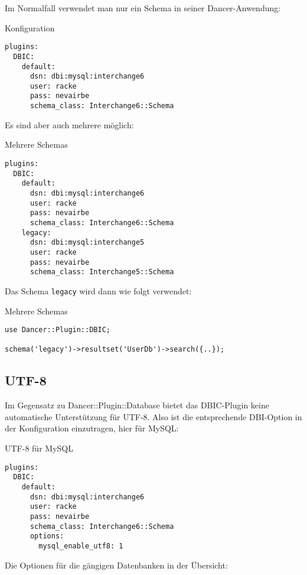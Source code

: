 Im Normalfall verwendet man nur ein Schema in seiner
Dancer-Anwendung:

\begin{frame}[fragile]{Konfiguration}
\begin{lstlisting}
plugins:
  DBIC:
    default:
      dsn: dbi:mysql:interchange6
      user: racke
      pass: nevairbe
      schema_class: Interchange6::Schema
\end{lstlisting}
\end{frame}

Es sind aber auch mehrere möglich:

\begin{frame}[fragile]{Mehrere Schemas}
\begin{lstlisting}
plugins:
  DBIC:
    default:
      dsn: dbi:mysql:interchange6
      user: racke
      pass: nevairbe
      schema_class: Interchange6::Schema
    legacy:
      dsn: dbi:mysql:interchange5
      user: racke
      pass: nevairbe
      schema_class: Interchange5::Schema
\end{lstlisting}
\end{frame}

Das Schema \verb|legacy| wird dann wie folgt verwendet:

\begin{frame}[fragile]{Mehrere Schemas}
\begin{lstlisting}
use Dancer::Plugin::DBIC;

schema('legacy')->resultset('UserDb')->search({..});
\end{lstlisting}
\end{frame}

\subsection{UTF-8}
Im Gegensatz zu Dancer::Plugin::Database bietet das DBIC-Plugin
keine automatische Unterstützung für UTF-8. Also ist die entsprechende
DBI-Option in der Konfiguration einzutragen, hier für MySQL:
\begin{frame}[fragile]{UTF-8 für MySQL}
\begin{lstlisting}
plugins:
  DBIC:
    default:
      dsn: dbi:mysql:interchange6
      user: racke
      pass: nevairbe
      schema_class: Interchange6::Schema
      options:
        mysql_enable_utf8: 1
\end{lstlisting}
\end{frame}

Die Optionen für die gängigen Datenbanken in der Übersicht:

